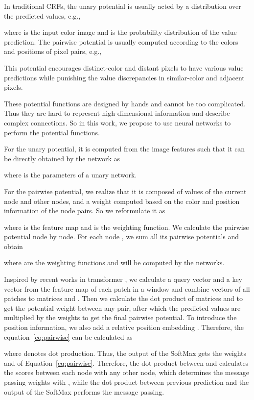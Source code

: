 \documentclass[10pt,twocolumn,letterpaper]{article}
\begin{document}
In traditional CRFs, the unary potential is usually acted by a distribution over the predicted values, e.g., 

where  is the input color image and  is the probability distribution of the value prediction.
The pairwise potential is usually computed according to the colors and positions of pixel pairs, e.g.,

This potential encourages distinct-color and distant pixels to have various value predictions while punishing the value discrepancies in similar-color and adjacent pixels. 

These potential functions are designed by hands and cannot be too complicated. Thus they are hard to represent high-dimensional information and describe complex connections. So in this work, we propose to use neural networks to perform the potential functions.
 
For the unary potential, it is computed from the image features such that it can be directly obtained by the network as

where  is the parameters of a unary network.

For the pairwise potential, we realize that it is composed of values of the current node and other nodes, and a weight computed based on the color and position information of the node pairs. So we reformulate it as

where  is the feature map and  is the weighting function. 
We calculate the pairwise potential node by node. For each node , we sum all its pairwise potentials and obtain

where  are the weighting functions and will be computed by the networks.

Inspired by recent works in transformer \cite{vaswani2017attention, dosovitskiy2020image}, we calculate a query vector  and a key vector  from the feature map of each patch in a window and combine vectors of all patches to matrices  and .
Then we calculate the dot product of matrices  and  to get the potential weight between any pair, after which the predicted values  are multiplied by the weights to get the final pairwise potential. 
To introduce the position information, we also add a relative position embedding . Therefore, the equation~\ref{eq:pairwise} can be calculated as


where  denotes dot production. Thus, the output of the SoftMax gets the weights  and  of Equation~\ref{eq:pairwise}. Therefore, the dot product between  and  calculates the scores between each node with any other node, which determines the message passing weights with , while the dot product between previous prediction  and the output of the SoftMax performs the message passing.
\end{document}
